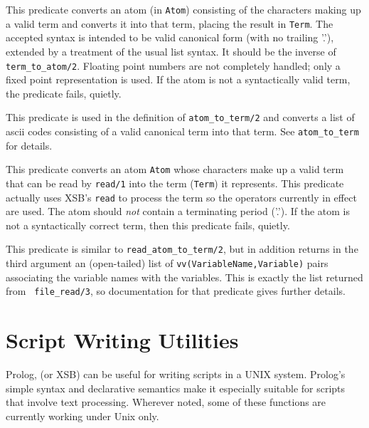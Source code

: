 \begin{description}

This predicate converts an atom (in {\tt Atom}) consisting of the
characters making up a valid term and converts it into that term,
placing the result in {\tt Term}.  The accepted syntax is intended to
be valid canonical form (with no trailing '.'), extended by a
treatment of the usual list syntax.  It should be the inverse of {\tt
term\_to\_atom/2}.  Floating point numbers are not completely handled; 
only a fixed point representation is used.  If the atom is not a
syntactically valid term, the predicate fails, quietly.


This predicate is used in the definition of {\tt atom\_to\_term/2} and 
converts a list of ascii codes consisting of a valid canonical term
into that term.  See {\tt atom\_to\_term} for details.


This predicate converts an atom {\tt Atom} whose characters make up a
valid term that can be read by {\tt read/1} into the term ({\tt Term})
it represents.  This predicate actually uses XSB's {\tt read} to
process the term so the operators currently in effect are used.  The
atom should {\em not} contain a terminating period ('.'). If the atom
is not a syntactically correct term, then this predicate fails,
quietly.


This predicate is similar to {\tt read\_atom\_to\_term/2}, but in
addition returns in the third argument an (open-tailed) list of
{\tt vv(VariableName,Variable)} pairs associating the variable names
with the variables.  This is exactly the list returned from {\tt
file\_read/3}, so documentation for that predicate gives further details.

\end{description}



\section{Script Writing Utilities}

Prolog, (or XSB) can be useful for writing scripts in a UNIX system.
Prolog's simple syntax and declarative semantics make it especially
suitable for scripts that involve text processing.  Wherever noted, some of
these functions are currently working under Unix only.

